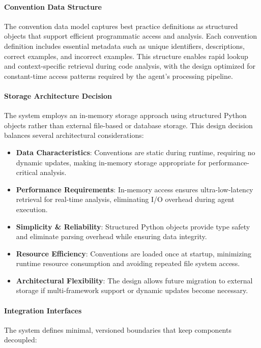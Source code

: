 \begin{spacing}{1.2}
\paragraph{Convention Data Structure}
The convention data model captures best practice definitions as structured objects that support efficient programmatic access and analysis. Each convention definition includes essential metadata such as unique identifiers, descriptions, correct examples, and incorrect examples. This structure enables rapid lookup and context-specific retrieval during code analysis, with the design optimized for constant-time access patterns required by the agent's processing pipeline.

\paragraph{Storage Architecture Decision}
The system employs an in-memory storage approach using structured Python objects rather than external file-based or database storage. This design decision balances several architectural considerations:

\begin{itemize}
    \item \textbf{Data Characteristics}: Conventions are static during runtime, requiring no dynamic updates, making in-memory storage appropriate for performance-critical analysis.
    \item \textbf{Performance Requirements}: In-memory access ensures ultra-low-latency retrieval for real-time analysis, eliminating I/O overhead during agent execution.
    \item \textbf{Simplicity \& Reliability}: Structured Python objects provide type safety and eliminate parsing overhead while ensuring data integrity.
    \item \textbf{Resource Efficiency}: Conventions are loaded once at startup, minimizing runtime resource consumption and avoiding repeated file system access.
    \item \textbf{Architectural Flexibility}: The design allows future migration to external storage if multi-framework support or dynamic updates become necessary.
\end{itemize} 

\paragraph{Integration Interfaces}
The system defines minimal, versioned boundaries that keep components decoupled:


\end{spacing}
